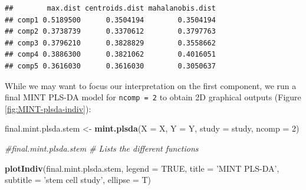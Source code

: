 \documentclass[]{book}
\newenvironment{Shaded}{\begin{snugshade}}{\end{snugshade}}
\newcommand{\CommentTok}[1]{\textcolor[rgb]{0.56,0.35,0.01}{\textit{#1}}}
\newcommand{\DataTypeTok}[1]{\textcolor[rgb]{0.13,0.29,0.53}{#1}}
\newcommand{\DecValTok}[1]{\textcolor[rgb]{0.00,0.00,0.81}{#1}}
\newcommand{\KeywordTok}[1]{\textcolor[rgb]{0.13,0.29,0.53}{\textbf{#1}}}
\newcommand{\NormalTok}[1]{#1}
\newcommand{\OperatorTok}[1]{\textcolor[rgb]{0.81,0.36,0.00}{\textbf{#1}}}
\newcommand{\OtherTok}[1]{\textcolor[rgb]{0.56,0.35,0.01}{#1}}
\newcommand{\StringTok}[1]{\textcolor[rgb]{0.31,0.60,0.02}{#1}}
\begin{document}
\begin{Shaded}
\end{Shaded}

\begin{verbatim}
##        max.dist centroids.dist mahalanobis.dist
## comp1 0.5189500      0.3504194        0.3504194
## comp2 0.3738739      0.3370612        0.3797763
## comp3 0.3796210      0.3828829        0.3558662
## comp4 0.3886300      0.3821062        0.4016051
## comp5 0.3616030      0.3616030        0.3050637
\end{verbatim}

While we may want to focus our interpretation on the first component, we run a final MINT PLS-DA model for \texttt{ncomp\ =\ 2} to obtain 2D graphical outputs (Figure \ref{fig:MINT-plsda-indiv}):

\begin{Shaded}
\begin{Highlighting}[]
\NormalTok{final.mint.plsda.stem <-}\StringTok{ }\KeywordTok{mint.plsda}\NormalTok{(}\DataTypeTok{X =}\NormalTok{ X, }\DataTypeTok{Y =}\NormalTok{ Y, }\DataTypeTok{study =}\NormalTok{ study, }\DataTypeTok{ncomp =} \DecValTok{2}\NormalTok{)}

\CommentTok{#final.mint.plsda.stem # Lists the different functions}

\KeywordTok{plotIndiv}\NormalTok{(final.mint.plsda.stem, }\DataTypeTok{legend =} \OtherTok{TRUE}\NormalTok{, }\DataTypeTok{title =} \StringTok{'MINT PLS-DA'}\NormalTok{, }
          \DataTypeTok{subtitle =} \StringTok{'stem cell study'}\NormalTok{, }\DataTypeTok{ellipse =}\NormalTok{ T)}
\end{Highlighting}
\end{Shaded}
\end{document}
